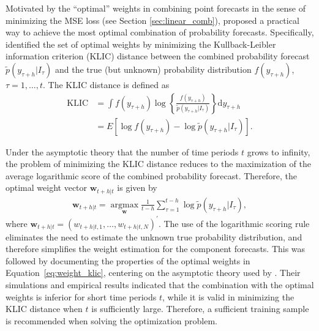 \documentclass[11pt]{article}
\begin{document}
Motivated by the ``optimal'' weights in combining point forecasts in the sense of minimizing the MSE loss (see Section \ref{sec:linear_comb}), \citet{Hall2007-lh} proposed a practical way to achieve the most optimal combination of probability forecasts. Specifically, \citet{Hall2007-lh} identified the set of optimal weights by minimizing the Kullback-Leibler information criterion (KLIC) distance between the combined probability forecast $\tilde{p}(y_{\tau+h}|I_{\tau})$ and the true (but unknown) probability distribution $f(y_{\tau+h})$, $\tau=1,\ldots,t$. The KLIC distance is defined as
\begin{align*}
\mathrm{KLIC} &= \int f(y_{\tau+h}) \log \left\{\frac{f(y_{\tau+h})}{\tilde{p}(y_{\tau+h}|I_{\tau})}\right\} \mathrm{d} y_{\tau+h} \\
&=E\left[\log f(y_{\tau+h})-\log \tilde{p}(y_{\tau+h}|I_{\tau})\right].
\end{align*}

Under the asymptotic theory that the number of time periods $t$ grows to infinity, the problem of minimizing the KLIC distance reduces to the maximization of the average logarithmic score of the combined probability forecast. Therefore, the optimal weight vector $\boldsymbol{w}_{t+h|t}$ is given by
\begin{align}
\label{eq:weight_klic}
\boldsymbol{w}_{t+h|t} = \underset{\boldsymbol{w}}{\operatorname{argmax}} \frac{1}{t-h} \sum_{\tau=1}^{t-h} \log \tilde{p}(y_{\tau+h}|I_{\tau}),
\end{align}
where $\boldsymbol{w}_{t+h|t}=\left(w_{t+h|t, 1}, \ldots, w_{t+h|t, N}\right)^{\prime}$. The use of the logarithmic scoring rule eliminates the need to estimate the unknown true probability distribution, and therefore simplifies the weight estimation for the component forecasts. This was followed by \citet{Pauwels2016-ci} documenting the properties of the optimal weights in Equation~\eqref{eq:weight_klic}, centering on the asymptotic theory used by \citet{Hall2007-lh}. Their simulations and empirical results indicated that the combination with the optimal weights is inferior for short time periods $t$, while it is valid in minimizing the KLIC distance when $t$ is sufficiently large. Therefore, a sufficient training sample is recommended when solving the optimization problem.
\end{document}
